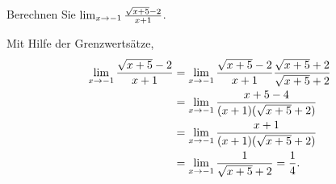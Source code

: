 \begin{example}
Berechnen Sie $\lim_{x\to-1} {\sqrt{x+5}-2\over x+1}$.
\end{example}
\begin{solution} 
Mit Hilfe der Grenzwertsätze,
\begin{align*}
\lim_{x\to-1} {\sqrt{x+5}-2\over x+1}&=
\lim_{x\to-1} {\sqrt{x+5}-2\over x+1}{\sqrt{x+5}+2\over \sqrt{x+5}+2} \\
&=\lim_{x\to-1} {x+5-4\over (x+1)(\sqrt{x+5}+2)} \\
&=\lim_{x\to-1} {x+1\over (x+1)(\sqrt{x+5}+2)} \\
&=\lim_{x\to-1} {1\over \sqrt{x+5}+2}={1\over4}.
\end{align*}
\end{solution}





